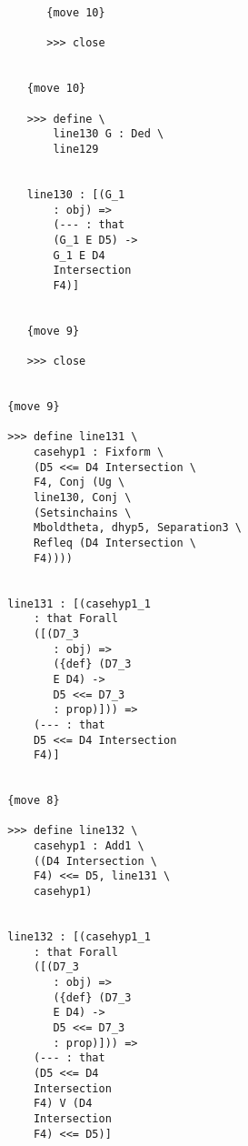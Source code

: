 \documentclass[12pt]{article}
\begin{document}
\begin{verbatim}
                                 {move 10}

                                 >>> close


                              {move 10}

                              >>> define \
                                  line130 G : Ded \
                                  line129


                              line130 : [(G_1 
                                  : obj) => 
                                  (--- : that 
                                  (G_1 E D5) -> 
                                  G_1 E D4 
                                  Intersection 
                                  F4)]


                              {move 9}

                              >>> close


                           {move 9}

                           >>> define line131 \
                               casehyp1 : Fixform \
                               (D5 <<= D4 Intersection \
                               F4, Conj (Ug \
                               line130, Conj \
                               (Setsinchains \
                               Mboldtheta, dhyp5, Separation3 \
                               Refleq (D4 Intersection \
                               F4))))


                           line131 : [(casehyp1_1 
                               : that Forall 
                               ([(D7_3 
                                  : obj) => 
                                  ({def} (D7_3 
                                  E D4) -> 
                                  D5 <<= D7_3 
                                  : prop)])) => 
                               (--- : that 
                               D5 <<= D4 Intersection 
                               F4)]


                           {move 8}

                           >>> define line132 \
                               casehyp1 : Add1 \
                               ((D4 Intersection \
                               F4) <<= D5, line131 \
                               casehyp1)


                           line132 : [(casehyp1_1 
                               : that Forall 
                               ([(D7_3 
                                  : obj) => 
                                  ({def} (D7_3 
                                  E D4) -> 
                                  D5 <<= D7_3 
                                  : prop)])) => 
                               (--- : that 
                               (D5 <<= D4 
                               Intersection 
                               F4) V (D4 
                               Intersection 
                               F4) <<= D5)]



\end{verbatim}
\end{document}

